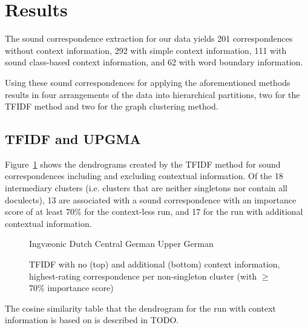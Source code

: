\documentclass[a4paper]{article}
\def\upper{\color{red}\FilledBigTriangleUp}
\def\central{\color{Dandelion}\FilledBigSquare}
\def\dutch{\color{ForestGreen}\FilledBigCircle}
\def\ingv{\color{Blue}\BigCircle}
\begin{document}
\section{Results}
\label{sec:results}

The sound correspondence extraction for our data
yields 201 correspondences without context information,
292 with simple context information,
111 with sound class-based context information,
and 62 with word boundary information.

Using these sound correspondences for
applying the aforementioned methods results in
four arrangements of the data into hierarchical partitions,
two for the TFIDF method and two for the graph clustering method.

\subsection{TFIDF and UPGMA}

Figure~\ref{fig:tfidf-dendrograms} shows the dendrograms
created by the TFIDF method for sound correspondences
including and excluding contextual information.
Of the 18 intermediary clusters
(i.e. clusters that are neither singletons nor contain all doculects),
13 are associated with a sound correspondence with an importance score of at least 70\% for the context-less run,
and 17 for the run with additional contextual information.

\begin{figure}[h]


\vspace{0.3em}
\begin{center}
{\ingv} Ingv\ae{}onic \hspace{1em}
{\dutch} Dutch \hspace{1em}
{\central} Central German \hspace{1em}
{\upper} Upper German
\end{center}
\caption{TFIDF with no (top) and additional (bottom) context information, highest-rating correspondence per non-singleton cluster (with $\geq$70\% importance score)}
\label{fig:tfidf-dendrograms}
\end{figure}

The cosine similarity table that the dendrogram
for the run with context information is based on
is described in TODO.
\end{document}
